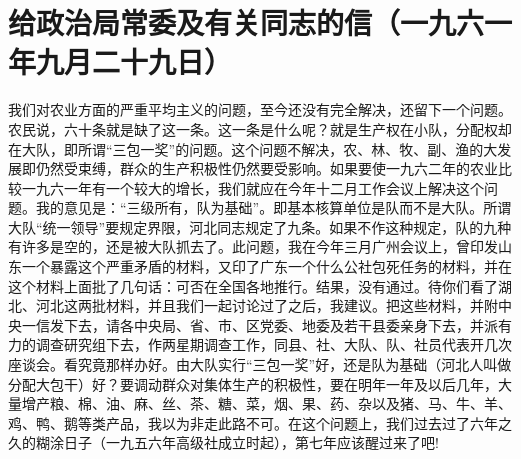 \section[给政治局常委及有关同志的信]{给政治局常委及有关同志的信（一九六一年九月二十九日）}

我们对农业方面的严重平均主义的问题，至今还没有完全解决，还留下一个问题。农民说，六十条就是缺了这一条。这一条是什么呢？就是生产权在小队，分配权却在大队，即所谓“三包一奖”的问题。这个问题不解决，农、林、牧、副、渔的大发展即仍然受束缚，群众的生产积极性仍然要受影响。如果要使一九六二年的农业比较一九六一年有一个较大的增长，我们就应在今年十二月工作会议上解决这个问题。我的意见是：“三级所有，队为基础”。即基本核算单位是队而不是大队。所谓大队“统一领导”要规定界限，河北同志规定了九条。如果不作这种规定，队的九种有许多是空的，还是被大队抓去了。此问题，我在今年三月广州会议上，曾印发山东一个暴露这个严重矛盾的材料，又印了广东一个什么公社包死任务的材料，并在这个材料上面批了几句话：可否在全国各地推行。结果，没有通过。待你们看了湖北、河北这两批材料，并且我们一起讨论过了之后，我建议。把这些材料，并附中央一信发下去，请各中央局、省、市、区党委、地委及若干县委亲身下去，并派有力的调查研究组下去，作两星期调查工作，同县、社、大队、队、社员代表开几次座谈会。看究竟那样办好。由大队实行“三包一奖”好，还是队为基础（河北人叫做分配大包干）好？要调动群众对集体生产的积极性，要在明年一年及以后几年，大量增产粮、棉、油、麻、丝、茶、糖、菜，烟、果、药、杂以及猪、马、牛、羊、鸡、鸭、鹅等类产品，我以为非走此路不可。在这个问题上，我们过去过了六年之久的糊涂日子（一九五六年高级社成立时起），第七年应该醒过来了吧! 

